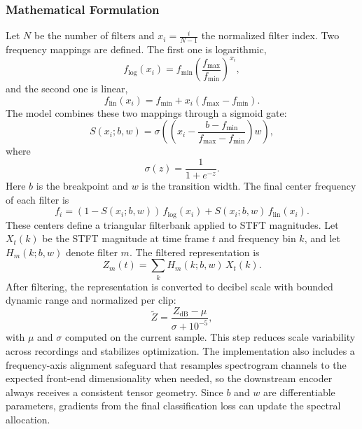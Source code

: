 \documentclass[a4paper,singleside,12pt]{report} %
\begin{document}
	\subsubsection{Mathematical Formulation}
	Let \(N\) be the number of filters and \(x_i=\frac{i}{N-1}\) the normalized filter index. Two frequency mappings are defined. The first one is logarithmic,
	\begin{equation}
		f_{\log}(x_i)=f_{\min}\left(\frac{f_{\max}}{f_{\min}}\right)^{x_i},
	\end{equation}
	and the second one is linear,
	\begin{equation}
		f_{\mathrm{lin}}(x_i)=f_{\min}+x_i(f_{\max}-f_{\min}).
	\end{equation}
	The model combines these two mappings through a sigmoid gate:
	\begin{equation}
		S(x_i;b,w)=\sigma\!\left(\left(x_i-\frac{b-f_{\min}}{f_{\max}-f_{\min}}\right)w\right),
	\end{equation}
	where
	\begin{equation}
		\sigma(z)=\frac{1}{1+e^{-z}}.
	\end{equation}
	Here \(b\) is the breakpoint and \(w\) is the transition width. The final center frequency of each filter is
	\begin{equation}
		f_i=(1-S(x_i;b,w))\,f_{\log}(x_i)+S(x_i;b,w)\,f_{\mathrm{lin}}(x_i).
	\end{equation}
	These centers define a triangular filterbank applied to STFT magnitudes. Let \(X_t(k)\) be the STFT magnitude at time frame \(t\) and frequency bin \(k\), and let \(H_m(k;b,w)\) denote filter \(m\). The filtered representation is
	\begin{equation}
		Z_m(t)=\sum_{k} H_m(k;b,w)\,X_t(k).
	\end{equation}
	After filtering, the representation is converted to decibel scale with bounded dynamic range and normalized per clip:
	\begin{equation}
		\tilde{Z}=\frac{Z_{\mathrm{dB}}-\mu}{\sigma+10^{-5}},
	\end{equation}
	with \(\mu\) and \(\sigma\) computed on the current sample. This step reduces scale variability across recordings and stabilizes optimization. The implementation also includes a frequency-axis alignment safeguard that resamples spectrogram channels to the expected front-end dimensionality when needed, so the downstream encoder always receives a consistent tensor geometry.
	Since \(b\) and \(w\) are differentiable parameters, gradients from the final classification loss can update the spectral allocation.
\end{document}
